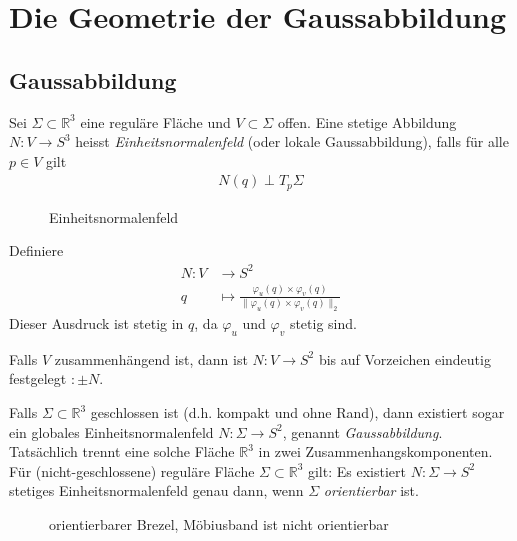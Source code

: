\documentclass[../main.tex]{subfiles}
\begin{document}
\chapter{Die Geometrie der Gaussabbildung}

\section{Gaussabbildung}



\begin{minipage}{0.7\columnwidth}
    \begin{definition}
        Sei $\Sigma \subset \mathbb{R}^{3}$ eine reguläre Fläche und $V \subset \Sigma$ offen. Eine stetige Abbildung $N:V \to S^3$ heisst \emph{Einheitsnormalenfeld} (oder lokale Gaussabbildung), falls für alle $p \in V$ gilt
        \begin{align*}
            N(q)\perp T_{p}\Sigma
        \end{align*}
    \end{definition}
\end{minipage}
\hspace{0.05\linewidth}
\begin{minipage}{0.3\columnwidth}
    \begin{figure}[H]
        \centering
        \def\svgwidth{\textwidth}
        
        \caption*{Einheitsnormalenfeld}        
    \end{figure}
\end{minipage}

\begin{existence}
    Definiere
    \begin{align*}
        N : V & \to S^{2} \\
        q & \mapsto \frac{\varphi_{u}(q) \times \varphi_{v}(q)}{\lVert \varphi_{u}(q) \times \varphi_{v}(q) \rVert_{2}}
    \end{align*}
    Dieser Ausdruck ist stetig in $q$, da $\varphi_{u}$ und $\varphi_{v}$ stetig sind.
\end{existence}
\begin{uniqueness}
    Falls $V$ zusammenhängend ist, dann ist $N:V \to S^{2}$ bis auf Vorzeichen eindeutig festgelegt $:\pm N$.
\end{uniqueness}
\begin{remark}
    Falls $\Sigma \subset \mathbb{R}^{3}$ geschlossen ist (d.h. kompakt und ohne Rand), dann existiert sogar ein globales Einheitsnormalenfeld $N:\Sigma \to S^{2}$, genannt \emph{Gaussabbildung}.
    Tatsächlich trennt eine solche Fläche $\mathbb{R}^{3}$ in zwei Zusammenhangskomponenten. Für (nicht-geschlossene) reguläre Fläche $\Sigma \subset \mathbb{R}^{3}$ gilt: Es existiert $N:\Sigma \to S^{2}$ stetiges Einheitsnormalenfeld genau dann,
    wenn $\Sigma$ \emph{orientierbar} ist.
\end{remark}
\begin{figure}[H]
    \centering
    \def\svgwidth{\textwidth}
    
    \caption*{orientierbarer Brezel, Möbiusband ist nicht orientierbar}        
\end{figure}
\end{document}
